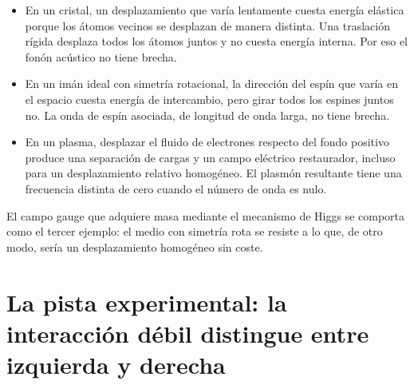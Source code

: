 \begin{itemize}
  \item En un cristal, un desplazamiento que varía lentamente cuesta energía elástica porque los átomos vecinos se desplazan de manera distinta. Una traslación rígida desplaza todos los átomos juntos y no cuesta energía interna. Por eso el fonón acústico no tiene brecha.
  \item En un imán ideal con simetría rotacional, la dirección del espín que varía en el espacio cuesta energía de intercambio, pero girar todos los espines juntos no. La onda de espín asociada, de longitud de onda larga, no tiene brecha.
  \item En un plasma, desplazar el fluido de electrones respecto del fondo positivo produce una separación de cargas y un campo eléctrico restaurador, incluso para un desplazamiento relativo homogéneo. El plasmón resultante tiene una frecuencia distinta de cero cuando el número de onda es nulo.
\end{itemize}

El campo gauge que adquiere masa mediante el mecanismo de Higgs se comporta como el tercer ejemplo: el medio con simetría rota se resiste a lo que, de otro modo, sería un desplazamiento homogéneo sin coste.

\begin{classroomqa}
\end{classroomqa}

\begin{classroomqa}
\end{classroomqa}

\section{La pista experimental: la interacción débil distingue entre izquierda y derecha}

